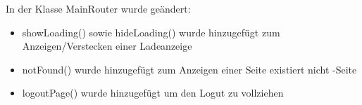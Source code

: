 In der Klasse MainRouter wurde geändert:
\begin{itemize}
	\item showLoading() sowie hideLoading() wurde hinzugefügt zum Anzeigen/Verstecken einer Ladeanzeige
	\item notFound() wurde hinzugefügt zum Anzeigen einer \glqq Seite existiert nicht \grqq -Seite
	\item logoutPage() wurde hinzugefügt um den Logut zu vollziehen
\end{itemize}